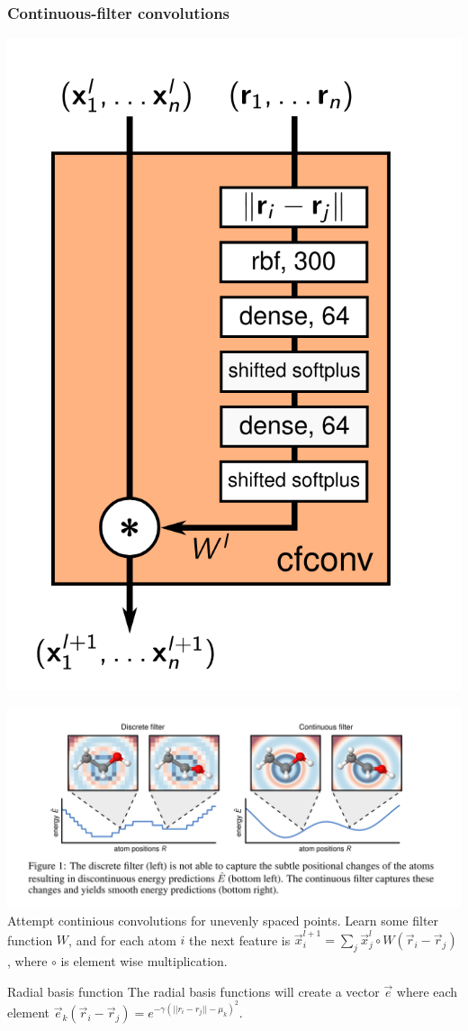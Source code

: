 \documentclass{beamer}
\begin{document}
\begin{frame}
  \frametitle{Continuous-filter convolutions}
  \begin{minipage}{4cm}
    \includegraphics[width=\linewidth]{./cfconv_block.png}
  \end{minipage}%
  \small\begin{minipage}{8cm}
  \includegraphics[width=\linewidth]{./cfconv.png}
  Attempt continious convolutions for unevenly spaced points.
  Learn some filter function $W$, and for each atom $i$ the next feature is $\vec{x}_i^{l+1} = \sum_j \vec{x}_j^l \circ W(\vec{r}_i - \vec{r}_j)$, where $\circ$ is element wise multiplication.
  \end{minipage}
  \begin{block}{Radial basis function}
    The radial basis functions will create a vector $\vec{e}$ where each element $\vec{e}_k(\vec{r}_i - \vec{r}_j) = e^{-\gamma (||r_i - r_j|| - \mu_k)^2}$.
  \end{block}
\end{frame}
\end{document}
